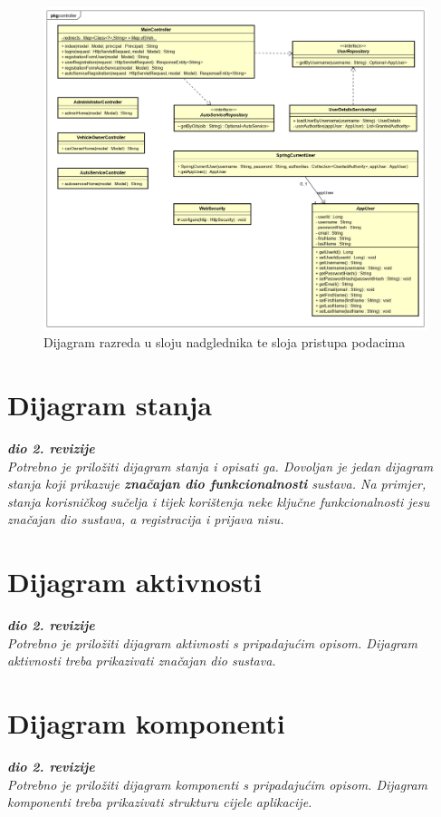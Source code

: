 		\begin{figure}[H]
			\centering
			\includegraphics[width=0.9\linewidth]{dijagrami/class_diagram_ctrl}
			\caption{Dijagram razreda u sloju nadglednika te sloja pristupa podacima}
			\label{fig:classdiagramctrl}
		\end{figure}
	
		
			
			
			\eject
		
		\section{Dijagram stanja}
			
			
			\textbf{\textit{dio 2. revizije}}\\
			
			\textit{Potrebno je priložiti dijagram stanja i opisati ga. Dovoljan je jedan dijagram stanja koji prikazuje \textbf{značajan dio funkcionalnosti} sustava. Na primjer, stanja korisničkog sučelja i tijek korištenja neke ključne funkcionalnosti jesu značajan dio sustava, a registracija i prijava nisu. }
			
			
			\eject 
		
		\section{Dijagram aktivnosti}
			
			\textbf{\textit{dio 2. revizije}}\\
			
			 \textit{Potrebno je priložiti dijagram aktivnosti s pripadajućim opisom. Dijagram aktivnosti treba prikazivati značajan dio sustava.}
			
			\eject
		\section{Dijagram komponenti}
		
			\textbf{\textit{dio 2. revizije}}\\
		
			 \textit{Potrebno je priložiti dijagram komponenti s pripadajućim opisom. Dijagram komponenti treba prikazivati strukturu cijele aplikacije.}